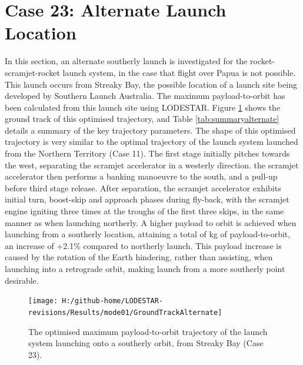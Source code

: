 \section{Case 23: Alternate Launch Location}
In this section, an alternate southerly launch is investigated for the rocket-scramjet-rocket launch system, in the case that flight over Papua is not possible. This launch occurs from Streaky Bay, the possible location of a launch site being developed by Southern Launch Australia\cite{Council2016}. The maximum payload-to-orbit has been calculated from this launch site using LODESTAR. Figure \ref{fig:GroundTrackAlternate} shows the ground track of this optimised trajectory, and Table \ref{tab:summaryalternate} details a summary of the key trajectory parameters. The shape of this optimised trajectory is very similar to the optimal trajectory of the launch system launched from the Northern Territory (Case 11). The first stage initially pitches towards the west, separating the scramjet accelerator in a westerly direction. the scramjet accelerator then performs a banking manoeuvre to the south, and a pull-up before third stage release. After separation, the scramjet accelerator exhibits initial turn, boost-skip and approach phases during fly-back, with the scramjet engine igniting three times at the troughs of the first three skips, in the same manner as when launching northerly. A higher payload to orbit is achieved when launching from a southerly location, attaining a total of \PayloadToOrbitAlternate kg of payload-to-orbit, an increase of +2.1\% compared to northerly launch. This payload increase is caused by the rotation of the Earth hindering, rather than assisting, when launching into a retrograde orbit, making launch from a more southerly point desirable. 
\begin{figure}[!ht]
	\centering
	\texttt{[image: H:/github-home/LODESTAR-revisions/Results/mode01/GroundTrackAlternate]}
	\caption{The optimised maximum payload-to-orbit trajectory of the launch system launching onto a southerly orbit, from Streaky Bay (Case 23).}
	\label{fig:GroundTrackAlternate}
\end{figure}
